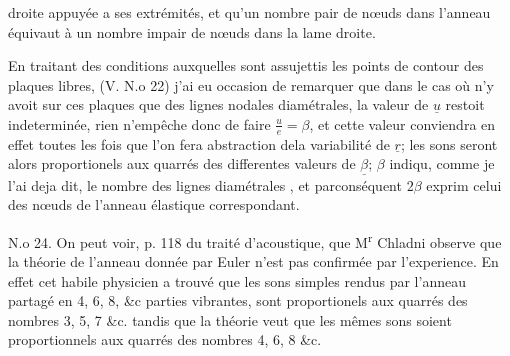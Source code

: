 \documentclass[11pt,a4paper]{article}
\begin{document}

droite appuyée a ses extrémités, et  qu'un
nombre pair de nœuds dans l'anneau équivaut à un
nombre impair de nœuds dans la lame droite.

En traitant des conditions auxquelles sont assujettis les
points de contour des plaques libres, (V. N.o 22) j'ai eu occasion
de remarquer que dans le cas où  n'y avoit
sur ces plaques que des lignes nodales diamétrales,
 la valeur de $\underline{u}$ restoit indeterminée,
rien n'empêche donc de faire $\frac{u}{e} = \beta$, et cette valeur  conviendra en effet toutes les fois que l'on fera
abstraction dela variabilité de $\underline{r}$; les sons seront alors
proportionels aux quarrés des differentes valeurs de $\underline{\beta}$; 
$\beta$ indiqu, comme je l'ai deja dit, le nombre des
lignes diamétrales  , et \struck{$2\beta$} parconséquent $2\beta$ exprim
celui des nœuds de l'anneau élastique correspondant.

N.o 24. On peut voir, p. 118 du traité d'acoustique, que M\textsuperscript{r}
Chladni observe que la théorie de l'anneau donnée par
Euler n'est pas confirmée par l'experience. En effet cet
habile physicien a trouvé que les sons simples rendus
par l'anneau partagé en 4, 6, 8, \&c parties vibrantes,
sont proportionels aux quarrés des nombres 3, 5, 7 \&c.
tandis que la théorie veut que les mêmes sons soient
proportionnels aux quarrés des nombres 4, 6, 8 \&c.

\end{document}
